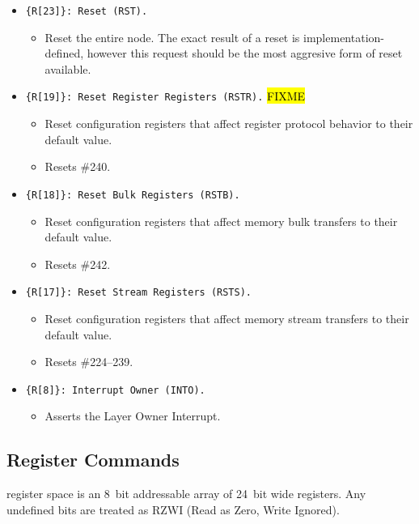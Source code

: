 \begin{itemize}
  \item \texttt{\{R[23]\}: Reset (RST).}
    \begin{itemize}
      \item Reset the entire node. The exact result of a reset is
        implementation-defined, however this request should be the most
        aggresive form of reset available.
    \end{itemize}
  \item \texttt{\{R[19]\}: Reset Register Registers (RSTR).} \hl{FIXME}
    \begin{itemize}
      \item Reset \proto configuration registers that affect register protocol
        behavior to their default value.
      \item Resets \#240.
    \end{itemize}
  \item \texttt{\{R[18]\}: Reset Bulk Registers (RSTB).}
    \begin{itemize}
      \item Reset \proto configuration registers that affect memory bulk
        transfers to their default value.
      \item Resets \#242.
    \end{itemize}
  \item \texttt{\{R[17]\}: Reset Stream Registers (RSTS).}
    \begin{itemize}
      \item Reset \proto configuration registers that affect memory stream
        transfers to their default value.
      \item Resets \#224--239.
    \end{itemize}
  \item \texttt{\{R[8]\}: Interrupt Owner (INTO).}
    \begin{itemize}
      \item Asserts the Layer Owner Interrupt.
    \end{itemize}
\end{itemize}

\subsection{Register Commands}
\label{cmd:reg}
\proto register space is an 8~bit addressable array of 24~bit wide registers.
Any undefined bits are treated as RZWI (Read as Zero, Write Ignored).

